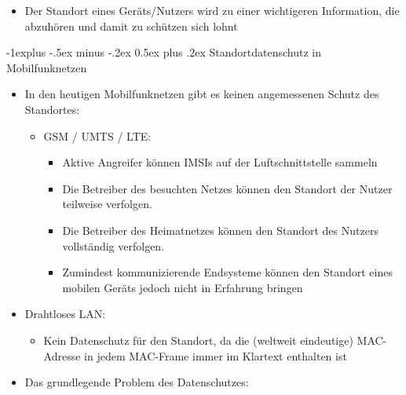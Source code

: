 \documentclass[a4paper]{article}
\makeatletter
\renewcommand{\subsection}{\@startsection{subsection}{2}{0mm}%
 {-1explus -.5ex minus -.2ex}%
 {0.5ex plus .2ex}%
 {\normalfont\normalsize\bfseries}}
\makeatother
\begin{document}
\begin{multicols}{3}
\begin{itemize}
\begin{itemize}
                        \begin{itemize}
                            \item
                                  Der Standort eines Geräts/Nutzers wird zu einer wichtigeren
                                  Information, die abzuhören und damit zu schützen sich lohnt
                        \end{itemize}
              \end{itemize}
    \end{itemize}


    \subsection{Standortdatenschutz in
        Mobilfunknetzen}

    \begin{itemize}
        \item
              In den heutigen Mobilfunknetzen gibt es keinen angemessenen Schutz des
              Standortes:

              \begin{itemize}
                  \item
                        GSM / UMTS / LTE:

                        \begin{itemize}
                            \item
                                  Aktive Angreifer können IMSIs auf der Luftschnittstelle sammeln
                            \item
                                  Die Betreiber des besuchten Netzes können den Standort der Nutzer
                                  teilweise verfolgen.
                            \item
                                  Die Betreiber des Heimatnetzes können den Standort des Nutzers
                                  vollständig verfolgen.
                            \item
                                  Zumindest kommunizierende Endsysteme können den Standort eines
                                  mobilen Geräts jedoch nicht in Erfahrung bringen
                        \end{itemize}
              \end{itemize}
        \item
              Drahtloses LAN:

              \begin{itemize}
                  \item
                        Kein Datenschutz für den Standort, da die (weltweit eindeutige)
                        MAC-Adresse in jedem MAC-Frame immer im Klartext enthalten ist
              \end{itemize}
        \item
              Das grundlegende Problem des Datenschutzes:


\end{itemize}
\end{multicols}
\end{document}

